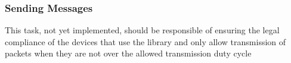 \subsubsection*{Sending Messages}
This task, not yet implemented, should be responsible of ensuring the legal compliance of the devices that use the library and only allow transmission of packets when they are not over the allowed transmission duty cycle
